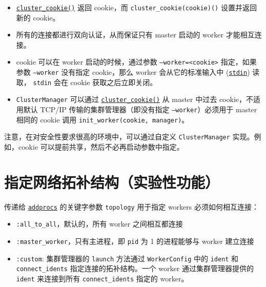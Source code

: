 \begin{itemize}
\item \hyperlink{914110747490695974}{\texttt{cluster\_cookie()}} 返回 cookie，而 \texttt{cluster\_cookie(cookie)()} 设置并返回新的 cookie。


\item 所有的连接都进行双向认证，从而保证只有 master 启动的 worker 才能相互连接。


\item cookie 可以在 worker 启动的时候，通过参数 \texttt{--worker=<cookie>} 指定，如果参数 \texttt{--worker} 没有指定 cookie，那么 worker 会从它的标准输入中 (\hyperlink{3330957653919693521}{\texttt{stdin}}) 读取， \texttt{stdin} 会在 cookie 获取之后立即关闭。


\item \texttt{ClusterManager} 可以通过 \hyperlink{914110747490695974}{\texttt{cluster\_cookie()}} 从 master 中过去 cookie，不适用默认 TCP/IP 传输的集群管理器（即没有指定 \texttt{--worker}）必须用于 master 相同的 cookie 调用 \texttt{init\_worker(cookie, manager)}。

\end{itemize}


注意，在对安全性要求很高的环境中，可以通过自定义 \texttt{ClusterManager} 实现。例如，cookie 可以提前共享，然后不必再启动参数中指定。



\hypertarget{850726815620521431}{}


\section{指定网络拓补结构（实验性功能）}



传递给 \hyperlink{2657399037748470653}{\texttt{addprocs}} 的关键字参数 \texttt{topology} 用于指定 workers 必须如何相互连接：



\begin{itemize}
\item \texttt{:all\_to\_all}，默认的，所有 worker 之间相互都连接


\item \texttt{:master\_worker}，只有主进程，即 \texttt{pid} 为 1 的进程能够与 worker 建立连接


\item \texttt{:custom}: 集群管理器的 \texttt{launch} 方法通过 \texttt{WorkerConfig} 中的 \texttt{ident} 和 \texttt{connect\_idents} 指定连接的拓补结构。一个 worker 通过集群管理器提供的 \texttt{ident} 来连接到所有 \texttt{connect\_idents} 指定的 worker。

\end{itemize}


